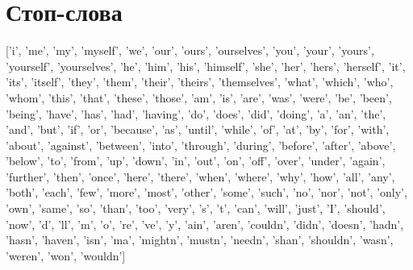 \appendix
\chapter{Стоп-слова}
{['i', 'me', 'my', 'myself', 'we', 'our', 'ours', 'ourselves', 'you', 'your', 'yours', 'yourself', 'yourselves', 'he', 'him', 'his', 'himself', 'she', 'her', 'hers', 'herself', 'it', 'its', 'itself', 'they', 'them', 'their', 'theirs', 'themselves', 'what', 'which', 'who', 'whom', 'this', 'that', 'these', 'those', 'am', 'is', 'are', 'was', 'were', 'be', 'been', 'being', 'have', 'has', 'had', 'having', 'do', 'does', 'did', 'doing', 'a', 'an', 'the', 'and', 'but', 'if', 'or', 'because', 'as', 'until', 'while', 'of', 'at', 'by', 'for', 'with', 'about', 'against', 'between', 'into', 'through', 'during', 'before', 'after', 'above', 'below', 'to', 'from', 'up', 'down', 'in', 'out', 'on', 'off', 'over', 'under', 'again', 'further', 'then', 'once', 'here', 'there', 'when', 'where', 'why', 'how', 'all', 'any', 'both', 'each', 'few', 'more', 'most', 'other', 'some', 'such', 'no', 'nor', 'not', 'only', 'own', 'same', 'so', 'than', 'too', 'very', 's', 't', 'can', 'will', 'just', 'I', 'should', 'now', 'd', 'll', 'm', 'o', 're', 've', 'y', 'ain', 'aren', 'couldn', 'didn', 'doesn', 'hadn', 'hasn', 'haven', 'isn', 'ma', 'mightn', 'mustn', 'needn', 'shan', 'shouldn', 'wasn', 'weren', 'won', 'wouldn']}